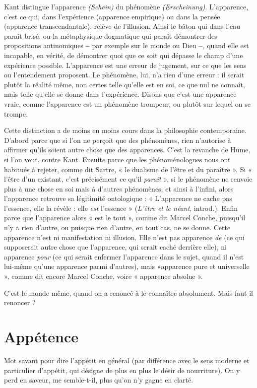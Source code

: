 Kant distingue l'apparence {\it (Schein)} du phénomène {\it (Erscheinung)}. L’apparence,
c'est ce qui, dans l’expérience (apparence empirique) ou dans la pensée
(apparence transcendantale), relève de l'illusion. Ainsi le bâton qui dans l’eau
paraît brisé, ou la métaphysique dogmatique qui paraît démontrer des propositions
antinomiques {\bf --} par exemple sur le monde ou Dieu {\bf --}, quand elle est incapable,
en vérité, de démontrer quoi que ce soit qui dépasse le champ d’une
expérience possible. L’apparence est une erreur de jugement, sur ce que les sens
ou l’entendement proposent. Le phénomène, lui, n’a rien d’une erreur : il serait
plutôt la réalité même, non certes telle qu’elle est en soi, ce que nul ne connaît,
mais telle qu’elle se donne dans l’expérience. Disons que c’est une apparence
vraie, comme l’apparence est un phénomène trompeur, ou plutôt sur lequel on
se trompe.

Cette distinction a de moins en moins cours dans la philosophie contemporaine.
D'abord parce que si l’on ne perçoit que des phénomènes, rien n’autorise
à affirmer qu’ils soient autre chose que des apparences. C’est la revanche de
Hume, si l’on veut, contre Kant. Ensuite parce que les phénoménologues nous
ont habitués à rejeter, comme dit Sartre, « le dualisme de l'être et du paraître ».
Si « l'être d’un existant, c’est précisément ce qu’il {\it paraît} », si le phénomène ne
renvoie plus à une chose en soi mais à d’autres phénomènes, et ainsi à l'infini,
alors l'apparence retrouve sa légitimité ontologique : « L’apparence ne cache
pas l'essence, elle la révèle : elle {\it est} l'essence » ({\it L'être et le néant}, introd.). Enfin
parce que l’apparence alors « est le tout », comme dit Marcel Conche, puisqu'il
n'y a rien d’autre, ou puisque rien d’autre, en tout cas, ne se donne. Cette
apparence n'est ni manifestation ni illusion. Elle n’est pas apparence {\it de} (ce qui
supposerait autre chose que l’apparence, qui serait caché derrière elle), ni apparence
{\it pour} (ce qui serait enfermer l'apparence dans le sujet, quand il n’est lui-même
qu'une apparence parmi d’autres), mais «apparence pure et
universelle », comme dit encore Marcel Conche, voire « apparence absolue ».

C’est le monde même, quand on a renoncé à le connaître absolument. Mais
faut-il renoncer ?

\section{Appétence}
Mot savant pour dire l’appétit en général (par différence avec
le sens moderne et particulier d’appétit, qui désigne de plus
en plus le désir de nourriture). On y perd en saveur, me semble-t-il, plus qu’on
n’y gagne en clarté.

